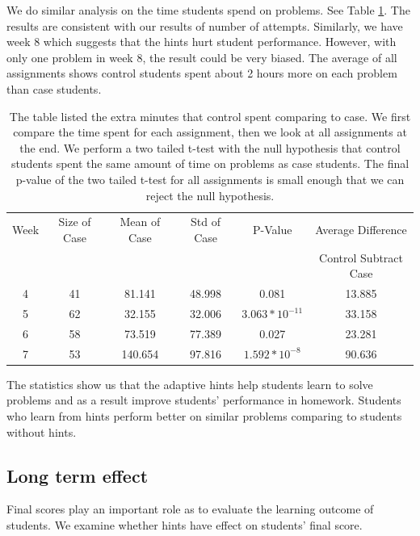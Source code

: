 \documentclass{llncs}
\begin{document}
We do similar analysis on the time students spend on problems. See Table \ref{tab:no_hint_time}. The results are consistent with our results of number of attempts. Similarly, we have week 8 which suggests that the hints hurt student performance. However, with only one problem in week 8, the result could be very biased. The average of all assignments shows control students spent about 2 hours more on each problem than case students.

\begin{table}
\caption{The table listed the extra minutes that control spent comparing to case. We first compare the time spent for each assignment, then we look at all assignments at the end. We perform a two tailed t-test with the null hypothesis that control students spent the same amount of time on problems as case students. The final p-value of the two tailed t-test for all assignments is small enough that we can reject the null hypothesis.}
\begin{center}
  \begin{tabular}{| c | c | c | c | c | c |}
    \hline
   Week & Size of Case & Mean of Case & Std of Case &  P-Value & Average Difference \\
      & & & & & Control Subtract Case  \\ \hline
	4 & 41 & 81.141 & 48.998 & 0.081 & 13.885\\
	5 & 62 & 32.155 & 32.006 & $3.063 * 10^{-11}$ & 33.158\\
	6 & 58 & 73.519 & 77.389 & 0.027 & 23.281 \\
	7 & 53 & 140.654 & 97.816 & $1.592 * 10^{-8}$ & 90.636 \\
	\hline
  \end{tabular}
  \label{tab:no_hint_time}
  \end{center}
\end{table}

The statistics show us that the adaptive hints help students learn to solve problems and as a result improve students' performance in homework. Students who learn from hints perform better on similar problems comparing to students without hints.

\subsection{Long term effect}
Final scores play an important role as to evaluate the learning outcome of students. We examine whether hints have effect on students' final score.
\end{document}
